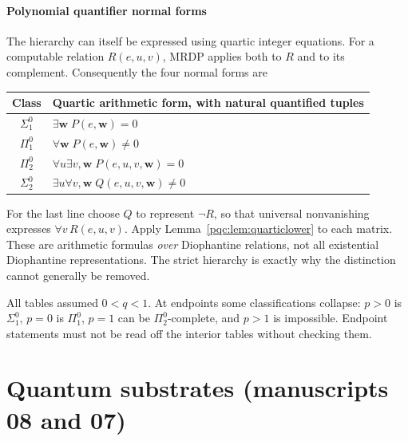 \documentclass[11pt,letterpaper]{article}
\numberwithin{equation}{section}
\theoremstyle{definition}
\theoremstyle{remark}
\newcommand{\sigone}{\Sigma^0_1}
\newcommand{\pione}{\Pi^0_1}
\newcommand{\sigtwo}{\Sigma^0_2}
\newcommand{\pitwo}{\Pi^0_2}
\begin{document}
\subsection{Polynomial quantifier normal forms}
The hierarchy can itself be expressed using quartic integer equations.
For a computable relation $R(e,u,v)$, MRDP applies both to $R$ and to its
complement. Consequently the four normal forms are
\begin{center}
\begin{tabular}{cl}
\toprule
Class & Quartic arithmetic form, with natural quantified tuples\\
\midrule
$\sigone$ & $\exists\mathbf w\;P(e,\mathbf w)=0$\\
$\pione$ & $\forall\mathbf w\;P(e,\mathbf w)\ne0$\\
$\pitwo$ & $\forall u\exists v,\mathbf w\;P(e,u,v,\mathbf w)=0$\\
$\sigtwo$ & $\exists u\forall v,\mathbf w\;Q(e,u,v,\mathbf w)\ne0$\\
\bottomrule
\end{tabular}
\end{center}
For the last line choose $Q$ to represent $\neg R$, so that universal
nonvanishing expresses $\forall v\,R(e,u,v)$. Apply
Lemma~\ref{pqc:lem:quarticlower} to each matrix. These are arithmetic formulas
\emph{over} Diophantine relations, not all existential Diophantine
representations. The strict hierarchy is exactly why the distinction
cannot generally be removed.

All tables assumed $0<q<1$. At endpoints some classifications collapse:
$p>0$ is $\sigone$, $p=0$ is $\pione$, $p=1$ can be $\pitwo$-complete,
and $p>1$ is impossible. Endpoint statements must not be read off the
interior tables without checking them.


\part{Quantum substrates (manuscripts 08 and 07)}
\label{pqc:part:quantum}
\end{document}
